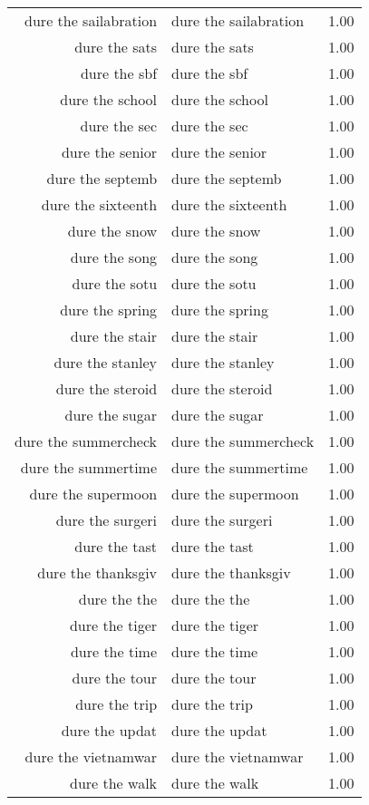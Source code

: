 \begin{table}[ht]
\begin{tabular}{rlr}
  dure the sailabration & dure the sailabration & 1.00 \\ 
  dure the sats & dure the sats & 1.00 \\ 
  dure the sbf & dure the sbf & 1.00 \\ 
  dure the school & dure the school & 1.00 \\ 
  dure the sec & dure the sec & 1.00 \\ 
  dure the senior & dure the senior & 1.00 \\ 
  dure the septemb & dure the septemb & 1.00 \\ 
  dure the sixteenth & dure the sixteenth & 1.00 \\ 
  dure the snow & dure the snow & 1.00 \\ 
  dure the song & dure the song & 1.00 \\ 
  dure the sotu & dure the sotu & 1.00 \\ 
  dure the spring & dure the spring & 1.00 \\ 
  dure the stair & dure the stair & 1.00 \\ 
  dure the stanley & dure the stanley & 1.00 \\ 
  dure the steroid & dure the steroid & 1.00 \\ 
  dure the sugar & dure the sugar & 1.00 \\ 
  dure the summercheck & dure the summercheck & 1.00 \\ 
  dure the summertime & dure the summertime & 1.00 \\ 
  dure the supermoon & dure the supermoon & 1.00 \\ 
  dure the surgeri & dure the surgeri & 1.00 \\ 
  dure the tast & dure the tast & 1.00 \\ 
  dure the thanksgiv & dure the thanksgiv & 1.00 \\ 
  dure the the & dure the the & 1.00 \\ 
  dure the tiger & dure the tiger & 1.00 \\ 
  dure the time & dure the time & 1.00 \\ 
  dure the tour & dure the tour & 1.00 \\ 
  dure the trip & dure the trip & 1.00 \\ 
  dure the updat & dure the updat & 1.00 \\ 
  dure the vietnamwar & dure the vietnamwar & 1.00 \\ 
  dure the walk & dure the walk & 1.00 \\ 

\end{tabular}
\end{table}

